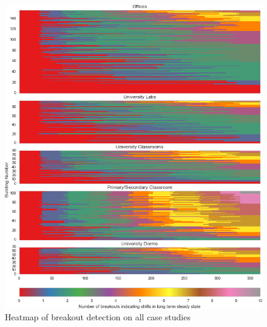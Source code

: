 \begin{figure}[ht!]
\begin{center}
\includegraphics[width=1\columnwidth]{figures/breakouts_heatmap/breakouts_heatmap}
\caption{Heatmap of breakout detection on all case studies
\label{fig:breakout_heatmap}%
}
\end{center}
\end{figure}

